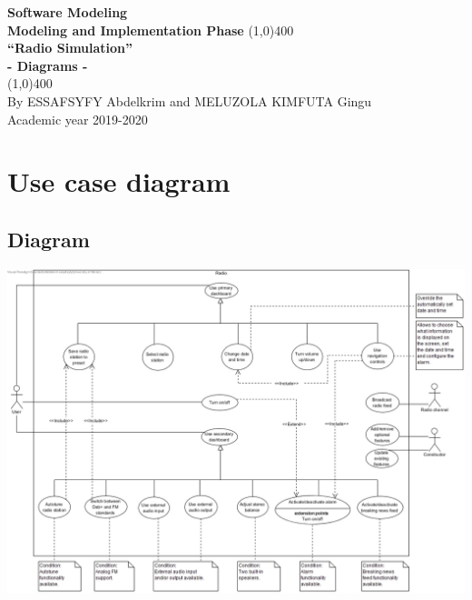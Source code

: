 \documentclass[11pt]{article}
\begin{document}
\begin{titlepage}
\begin{center}
\vspace*{1cm}
\Large{\textbf{Software Modeling}}\\
\Large{\textbf{Modeling and Implementation Phase}}
\vfill
\line(1,0){400}\\[1mm]
\huge{\textbf{“Radio Simulation”}}\\[3mm]
\Large{\textbf{- Diagrams -}}\\[1mm]
\line(1,0){400}\\
\vfill
By ESSAFSYFY Abdelkrim and MELUZOLA KIMFUTA Gingu\\
Academic year 2019-2020
\end{center}
\end{titlepage}

\tableofcontents
\thispagestyle{empty}
\clearpage
\setcounter{page}{1}

\section{Use case diagram}
\subsection{Diagram}
\vspace{10px}
\begin{center}
\includegraphics[width=15cm]{../Diagrams/useCase-v4.jpg}\\
\end{center}
\end{document}
